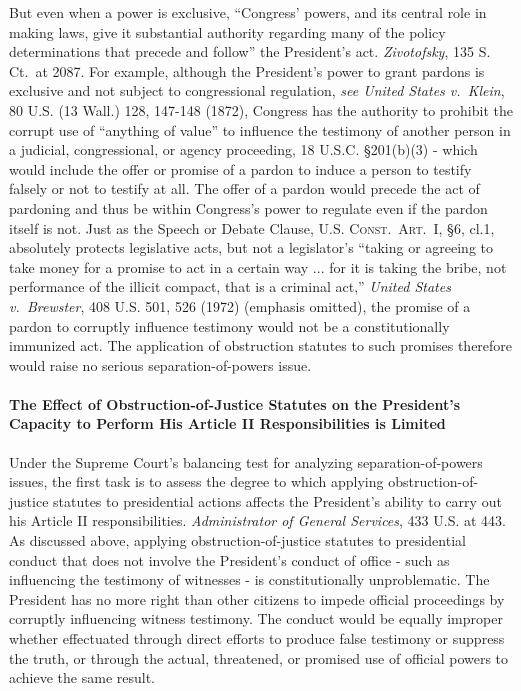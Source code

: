 But even when a power is exclusive, “Congress’ powers, and its central role in making laws, give it substantial authority regarding many of the policy determinations that precede and follow” the President’s act.
\textit{Zivotofsky}, 135 S. Ct.~at 2087.
For example, although the President’s power to grant pardons is exclusive and not subject to congressional regulation, \textit{see United States v.\ Klein}, 80 U.S. (13 Wall.) 128, 147-148 (1872), Congress has the authority to prohibit the corrupt use of “anything of value” to influence the testimony of another person in a judicial, congressional, or agency proceeding, 18 U.S.C. \S 201(b)(3) - which would include the offer or promise of a pardon to induce a person to testify falsely or not to testify at all.
The offer of a pardon would precede the act of pardoning and thus be within Congress’s power to regulate even if the pardon itself is not.
Just as the Speech or Debate Clause, \textsc{U.S. Const.\ Art.~I}, \S 6, cl.1, absolutely protects legislative acts, but not a legislator’s “taking or agreeing to take money for a promise to act in a certain way ... for it is taking the bribe, not performance of the illicit compact, that is a criminal act,” \textit{United States v.\ Brewster}, 408 U.S. 501, 526 (1972) (emphasis omitted), the promise of a pardon to corruptly influence testimony would not be a constitutionally immunized act.
The application of obstruction statutes to such promises therefore would raise no serious separation-of-powers issue.

\paragraph{The Effect of Obstruction-of-Justice Statutes on the President’s Capacity to Perform His Article II Responsibilities is Limited}

Under the Supreme Court’s balancing test for analyzing separation-of-powers issues, the first task is to assess the degree to which applying obstruction-of-justice statutes to presidential actions affects the President’s ability to carry out his Article II responsibilities.
\textit{Administrator of General Services}, 433 U.S. at 443.
As discussed above, applying obstruction-of-justice statutes to presidential conduct that does not involve the President’s conduct of office - such as influencing the testimony of witnesses - is constitutionally unproblematic.
The President has no more right than other citizens to impede official proceedings by corruptly influencing witness testimony.
The conduct would be equally improper whether effectuated through direct efforts to produce false testimony or suppress the truth, or through the actual, threatened, or promised use of official powers to achieve the same result.

